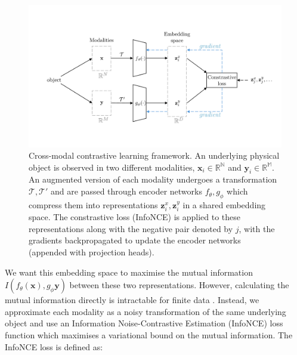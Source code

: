 \documentclass[a4paper,12pt]{article}
\begin{document}
\begin{figure}[H]
    \centering
    \includegraphics[width=\textwidth]{../figures/contrastive_learning.pdf}
    \caption{Cross-modal contrastive learning framework. An underlying physical object is observed in two different modalities, $\mathbf{x}_i \in \mathbb{R^N}$ and $\mathbf{y}_i \in \mathbb{R^M}$. An augmented version of each modality undergoes a transformation $\mathcal{T}, \mathcal{T}'$ and are passed through encoder networks $f_{\theta}, g_{\phi}$ which compress them into representations $\mathbf{z}^x_i, \mathbf{z}^y_i$ in a shared embedding space. The constrastive loss (InfoNCE) is applied to these representations along with the negative pair denoted by $j$, with the gradients backpropagated to update the encoder networks (appended with projection heads).}
    \label{fig:contrastive_learning}
\end{figure}


We want this embedding space to maximise the mutual information $I(f_{\theta}(\mathbf{x}),g_\phi{\mathbf{y}})$ between these two representations. However, calculating the mutual information directly is intractable for finite data \cite{mutualinfolimitation}. Instead, we approximate each modality as a noisy transformation of the same underlying object and use an Information Noise-Contrastive Estimation (InfoNCE) loss function \cite{infonce} which maximises a variational bound on the mutual information. The InfoNCE loss is defined as:
\end{document}
